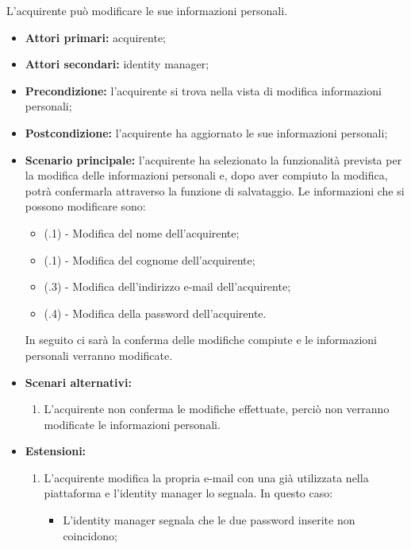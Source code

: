 
L'acquirente può modificare le sue informazioni personali.
\begin{itemize}
    \item \textbf{Attori primari:} acquirente;
    \item \textbf{Attori secondari:} identity manager;
    \item \textbf{Precondizione:} l'acquirente si trova nella vista di modifica informazioni personali;
    \item \textbf{Postcondizione:} l'acquirente ha aggiornato le sue informazioni personali;
    \item \textbf{Scenario principale:} l'acquirente ha selezionato la funzionalità prevista per la modifica delle informazioni personali e, dopo aver compiuto la modifica, potrà confermarla attraverso la funzione di salvataggio. Le informazioni che si possono modificare sono:
    \begin{itemize}
        \item (\actualUC.1) - Modifica del nome dell'acquirente;
        \item (\actualUC.1) - Modifica del cognome dell'acquirente;
        \item (\actualUC.3) - Modifica dell'indirizzo e-mail dell'acquirente;
        \item (\actualUC.4) - Modifica della password dell'acquirente.
    \end{itemize}
    In seguito ci sarà la conferma delle modifiche compiute e le informazioni personali verranno modificate.
    \item \textbf{Scenari alternativi:}
    \begin{enumerate}[label=\lett]
        \item L'acquirente non conferma le modifiche effettuate, perciò non verranno modificate le informazioni personali.
    \end{enumerate}
    \item \textbf{Estensioni:} 
    \begin{enumerate}[label=\lett]
        \item L'acquirente modifica la propria e-mail con una già utilizzata nella piattaforma e l'identity manager lo segnala. In questo caso:
        \begin{itemize}
            \item L'identity manager segnala che le due password inserite non coincidono;

\end{itemize}
\end{enumerate}
\end{itemize}
